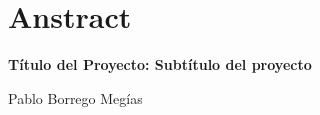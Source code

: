 \chapter{Anstract}

\begin{center}
    {\large\bfseries Título del Proyecto: Subtítulo del proyecto}\\
    \end{center}
    \begin{center}
    Pablo Borrego Megías \\
    \end{center}